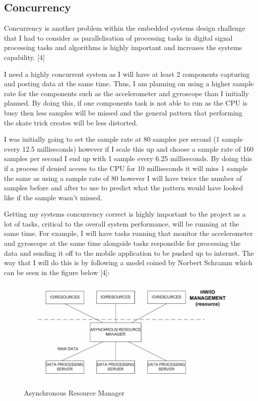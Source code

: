 \subsection{Concurrency}\label{analysis:esconcurrency}
Concurrency is another problem within the embedded systems design challenge that I had to consider as parallelisation of processing tasks in digital signal processing tasks and algorithms is highly important and increases the systems capability. [4] 

I need a highly concurrent system as I will have at least 2 components capturing and posting data at the same time. Thus, I am planning on using a higher sample rate for the components such as the accelerometer and gyroscope than I initially planned. By doing this, if one components task is not able to run as the CPU is busy then less samples will be missed and the general pattern that performing the skate trick creates will be less distorted. 

I was initially going to set the sample rate at 80 samples per second (1 sample every 12.5 milliseconds) however if I scale this up and choose a sample rate of 160 samples per second I end up with 1 sample every 6.25 milliseconds. By doing this if a process if denied access to the CPU for 10 milliseconds it will miss 1 sample the same as using a sample rate of 80 however I will have twice the number of samples before and after to use to predict what the pattern would have looked like if the sample wasn’t missed.

Getting my systems concurrency correct is highly important to the project as a lot of tasks, critical to the overall system performance, will be running at the same time. For example, I will have tasks running that monitor the accelerometer and gyroscope at the same time alongside tasks responsible for processing the data and sending it off to the mobile application to be pushed up to internet. The way that I will do this is by following a model coined by Norbert Schramm which can be seen in the figure below [4]: 
\begin{figure}[h]
\begin{center}
\includegraphics[width=.75\textwidth]{ANALYSIS/fig1.png}
\end{center}
\caption{Asynchronous Resource Manager}
\end{figure}

